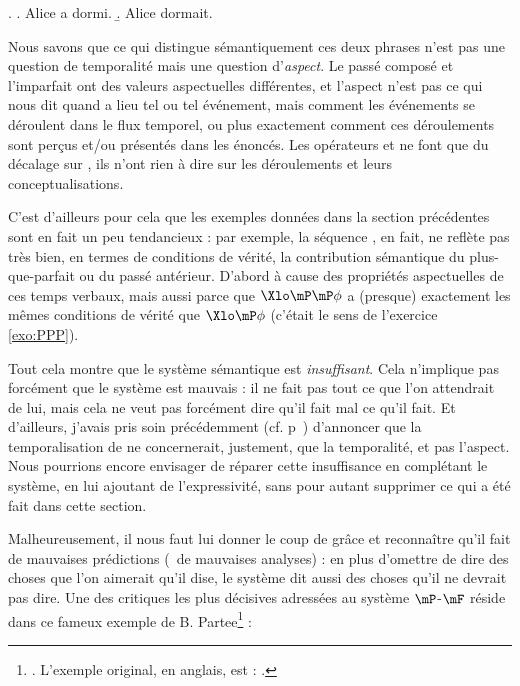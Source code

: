\ex.
\a. Alice a dormi.
\b. Alice dormait.


Nous savons que ce qui distingue sémantiquement ces deux phrases n'est pas
une question de temporalité mais une question
d'\emph{aspect}.  
Le passé composé et l'imparfait ont des valeurs
aspectuelles différentes, et l'aspect n'est pas ce qui nous dit
quand a lieu tel ou tel événement, mais comment les événements
se déroulent dans le flux temporel, ou plus exactement comment ces
déroulements sont perçus et/ou présentés dans les énoncés. Les
opérateurs {\mP} et {\mF} ne font que du décalage sur {\Tps}, ils
n'ont rien à dire sur les  déroulements et leurs conceptualisations. 

C'est d'ailleurs pour cela que les exemples données dans la section
précédentes sont en fait un peu tendancieux : par exemple, la séquence
{\mP\mP}, en fait, ne reflète pas très bien, en termes de conditions
de vérité, la contribution sémantique du plus-que-parfait ou du passé
antérieur.  D'abord à cause des propriétés aspectuelles de ces temps
verbaux, mais aussi parce que $\Xlo\mP\mP\phi$ a (presque) exactement les
mêmes conditions de vérité que $\Xlo\mP\phi$ (c'était le sens de l'exercice
\ref{exo:PPP}).

Tout cela montre que le système sémantique %
est
\emph{insuffisant}. %
Cela n'implique pas forcément que le
système est mauvais : il ne fait pas tout ce que l'on attendrait de lui,
mais cela ne veut pas forcément dire qu'il fait mal ce qu'il fait.  
Et d'ailleurs, j'avais pris soin précédemment (cf. p~\pageref{TpsvsAsp}) d'annoncer que la temporalisation de {\LO} ne concernerait, justement, que la temporalité, et pas l'aspect. 
Nous pourrions encore envisager de réparer cette insuffisance en 
complétant le système, en lui ajoutant de l'expressivité, sans pour autant
supprimer ce qui a été fait dans cette section. 

\medskip

Malheureusement, il nous faut lui donner le coup de grâce et
reconnaître qu'il fait de mauvaises prédictions (\ie\ de mauvaises
analyses) : en plus d'omettre de dire des choses que l'on aimerait qu'il
dise, le système dit aussi des choses qu'il ne devrait pas dire.
Une des critiques les plus décisives adressées au système $\mP$-$\mF$
 réside dans ce fameux exemple de
B. Partee\footnote{\citet{Partee:73JoP}. 
L'exemple original, en anglais, est :
  .} :


